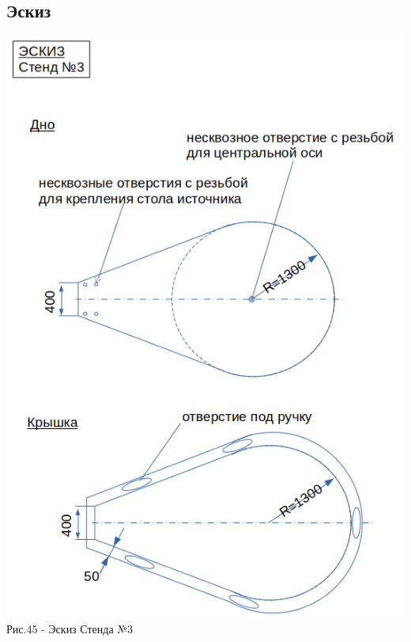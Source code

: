 \documentclass[11pt]{report}
\begin{document}
\subsection{Эскиз}
\includegraphics[scale=0.7]{stend_3_1}\\
Рис.45 - Эскиз Стенда №3 \\
\end{document}
